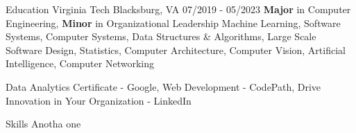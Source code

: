 \documentclass{resume}
\begin{document}
    \maketitle

    \begin{resSection}{Education}
        {Virginia Tech}
        {Blacksburg, VA}
        {07/2019 - 05/2023}
        {\textbf{Major} in Computer Engineering, \textbf{Minor} in Organizational Leadership}
        {Machine Learning, Software Systems, Computer Systems, Data Structures \& Algorithms, Large Scale Software Design, Statistics, Computer Architecture, Computer Vision, Artificial Intelligence, Computer Networking}

        {Data Analytics Certificate - Google, Web Development - CodePath, Drive Innovation in Your Organization - LinkedIn}{}
    \end{resSection}

    \begin{resSection}{Skills}
        Anotha one
    \end{resSection}




                                    
\end{document}
